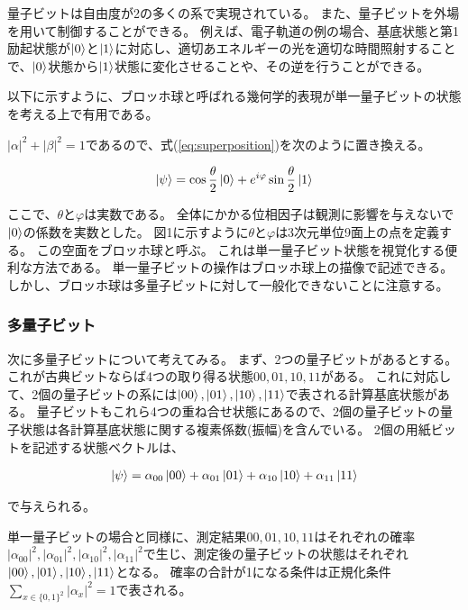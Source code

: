 \documentclass[platex,dvipdfmx]{jlreq}			%
\begin{document}
量子ビットは自由度が2の多くの系で実現されている。
また、量子ビットを外場を用いて制御することができる。
例えば、電子軌道の例の場合、基底状態と第1励起状態が$\ket{0}$と$\ket{1}$に対応し、適切あエネルギーの光を適切な時間照射することで、$\ket{0}$状態から$\ket{1}$状態に変化させることや、その逆を行うことができる。

以下に示すように、ブロッホ球と呼ばれる幾何学的表現が単一量子ビットの状態を考える上で有用である。

$|\alpha|^2 + |\beta|^2 = 1$であるので、式(\ref{eq:superposition})を次のように置き換える。

\begin{eqnarray}
    \ket{\psi} = \cos \frac{\theta}{2} \ket{0} + e^{i \varphi}\sin \frac{\theta}{2} \ket{1}
\end{eqnarray}

ここで、$\theta$と$\varphi$は実数である。
全体にかかる位相因子は観測に影響を与えないで$\ket{0}$の係数を実数とした。
図1に示すように$\theta$と$\varphi$は3次元単位9面上の点を定義する。
この空面をブロッホ球と呼ぶ。
これは単一量子ビット状態を視覚化する便利な方法である。
単一量子ビットの操作はブロッホ球上の描像で記述できる。
しかし、ブロッホ球は多量子ビットに対して一般化できないことに注意する。

\subsubsection{多量子ビット}
次に多量子ビットについて考えてみる。
まず、2つの量子ビットがあるとする。
これが古典ビットならば4つの取り得る状態$00, 01, 10, 11$がある。
これに対応して、2個の量子ビットの系には$\ket{00}, \ket{01}, \ket{10}, \ket{11}$で表される計算基底状態がある。
量子ビットもこれら4つの重ね合せ状態にあるので、2個の量子ビットの量子状態は各計算基底状態に関する複素係数(振幅)を含んでいる。
2個の用紙ビットを記述する状態ベクトルは、

\begin{eqnarray}
    \ket{\psi} = \alpha_{00} \ket{00} + \alpha_{01} \ket{01} + \alpha_{10} \ket{10} + \alpha_{11} \ket{11}
\end{eqnarray}

で与えられる。


単一量子ビットの場合と同様に、測定結果$00, 01, 10, 11$はそれぞれの確率$|\alpha_{00}|^2, |\alpha_{01}|^2, |\alpha_{10}|^2, |\alpha_{11}|^2$で生じ、測定後の量子ビットの状態はそれぞれ$\ket{00}, \ket{01}, \ket{10}, \ket{11}$となる。
確率の合計が1になる条件は正規化条件$\sum_{x \in \{0, 1\}^2} |\alpha_x|^2 = 1$で表される。
\end{document}
